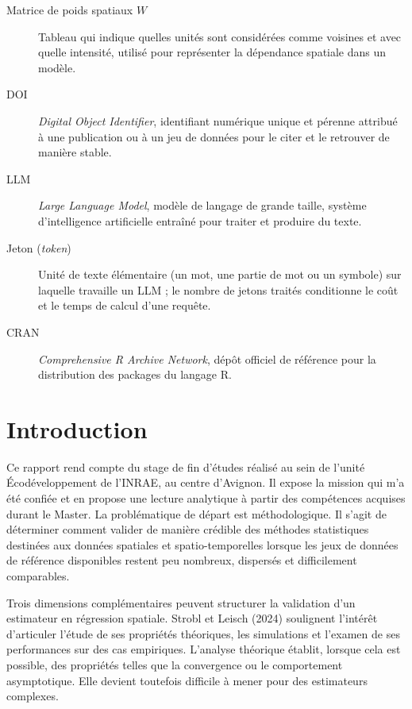 \documentclass[11pt,a4paper]{article}
\begin{document}
\begin{description}
\item[Matrice de poids spatiaux $W$] Tableau qui indique quelles unités sont considérées comme voisines et avec quelle intensité, utilisé pour représenter la dépendance spatiale dans un modèle.
\item[DOI] \textit{Digital Object Identifier}, identifiant numérique unique et pérenne attribué à une publication ou à un jeu de données pour le citer et le retrouver de manière stable.
\item[LLM] \textit{Large Language Model}, modèle de langage de grande taille, système d'intelligence artificielle entraîné pour traiter et produire du texte.
\item[Jeton (\textit{token})] Unité de texte élémentaire (un mot, une partie de mot ou un symbole) sur laquelle travaille un LLM ; le nombre de jetons traités conditionne le coût et le temps de calcul d'une requête.
\item[CRAN] \textit{Comprehensive R Archive Network}, dépôt officiel de référence pour la distribution des packages du langage R.
\end{description}

\newpage

\section{Introduction}

Ce rapport rend compte du stage de fin d'études réalisé au sein de l'unité Écodéveloppement de l'INRAE, au centre d'Avignon. Il expose la mission qui m'a été confiée et en propose une lecture analytique à partir des compétences acquises durant le Master. La problématique de départ est méthodologique. Il s'agit de déterminer comment valider de manière crédible des méthodes statistiques destinées aux données spatiales et spatio-temporelles lorsque les jeux de données de référence disponibles restent peu nombreux, dispersés et difficilement comparables.

Trois dimensions complémentaires peuvent structurer la validation d'un estimateur en régression spatiale. Strobl et Leisch (2024) soulignent l'intérêt d'articuler l'étude de ses propriétés théoriques, les simulations et l'examen de ses performances sur des cas empiriques. L'analyse théorique établit, lorsque cela est possible, des propriétés telles que la convergence ou le comportement asymptotique. Elle devient toutefois difficile à mener pour des estimateurs complexes.
\end{document}
